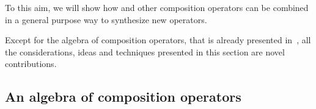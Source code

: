 To this aim,
we will show how \Q@Override@
and other composition operators can be 
combined in a general purpose way to synthesize
new operators.

Except for the algebra of composition operators, that is already presented in~\cite{servetto2014meta},
all the considerations, ideas and techniques presented in this section are novel contributions.



\subsection*{An algebra of composition operators}

